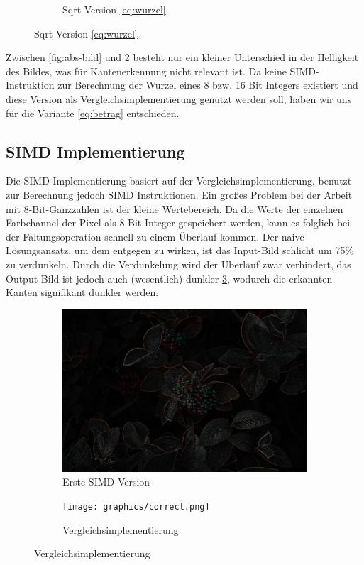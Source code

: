 \documentclass[course=erap]{aspdoc}
\begin{document}
\begin{figure}[H]
\begin{subfigure}{.5\columnwidth}
        \caption{Sqrt Version \ref{eq:wurzel}}
        \label{fig:sqrt-bild}
    \end{subfigure}
\end{figure}
Zwischen \ref{fig:abs-bild} und \ref{fig:sqrt-bild} besteht nur ein kleiner Unterschied in der Helligkeit des Bildes, was für Kantenerkennung nicht relevant ist.
Da keine SIMD-Instruktion zur Berechnung der Wurzel eines 8 bzw. 16 Bit Integers existiert und diese Version als Vergleichsimplementierung genutzt werden soll, haben wir uns für die Variante \ref{eq:betrag} entschieden.
\subsection{SIMD Implementierung}
\label{sec:simd-implementierung}
Die SIMD Implementierung basiert auf der Vergleichsimplementierung, benutzt zur Berechnung jedoch SIMD Instruktionen.
Ein großes Problem bei der Arbeit mit 8-Bit-Ganzzahlen ist der kleine Wertebereich.
Da die Werte der einzelnen Farbchannel der Pixel als 8 Bit Integer gespeichert werden, kann es folglich bei der Faltungsoperation schnell zu einem Überlauf kommen.
Der naive Lösungsansatz, um dem entgegen zu wirken, ist das Input-Bild schlicht um 75\% zu verdunkeln.
Durch die Verdunkelung wird der Überlauf zwar verhindert, das Output Bild ist jedoch auch (wesentlich) dunkler {\ref{fig:dark}}, wodurch die erkannten Kanten signifikant dunkler werden.
\begin{figure}[H]
    \begin{subfigure}{.5\columnwidth}
        \centering
        \includegraphics[width=\columnwidth]{graphics/dark.png}
        \caption{Erste SIMD Version}
        \label{fig:dark}
    \end{subfigure}
    \begin{subfigure}{.5\columnwidth}
        \centering
        \texttt{[image: graphics/correct.png]}
        \caption{Vergleichsimplementierung}
        \label{fig:correct}
    \end{subfigure}
\end{figure}
\end{document}
